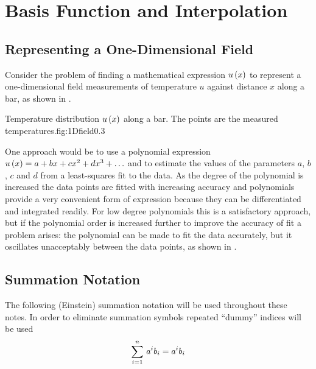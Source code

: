 \clearemptydoublepage
\chapter{Basis Function and Interpolation}
\label{cha:basisfunctions}

\section{Representing a One-Dimensional Field}
\label{sec:reponedfield}

Consider the problem of finding a mathematical expression $ u\left( x \right) $ to
represent a one-dimensional field \eg measurements of temperature $u$
against distance $x$ along a bar, as shown in .


  {Temperature distribution $ u\left( x \right) $ along a bar.
  The points are the measured temperatures.}{fig:1Dfield}{0.3}

One approach would be to use a polynomial expression $ u\left( x \right)  = a + bx +
cx^{2} + dx^{3} + \ldots$ and to estimate the values of the parameters
$a$, $b$, $c$ and $d$ from a least-squares fit to the data.  As the degree of the
polynomial is increased the data points are fitted with increasing accuracy
and polynomials provide a very convenient form of expression because they can
be differentiated and integrated readily. For low degree polynomials this is a
satisfactory approach, but if the polynomial order is increased further to
improve the accuracy of fit a problem arises: the polynomial can be made to
fit the data accurately, but it oscillates unacceptably between the data
points, as shown in .  

\section{Summation Notation}
\label{sec:summation notation}

The following (Einstein) summation notation will be used throughout these notes. In order to
eliminate summation symbols repeated ``dummy'' indices will be used \ie
\begin{equation}
    \displaystyle\sum_{i=1}^{n} \,a^{i}b_{i} =a^{i}b_{i}
\end{equation}

